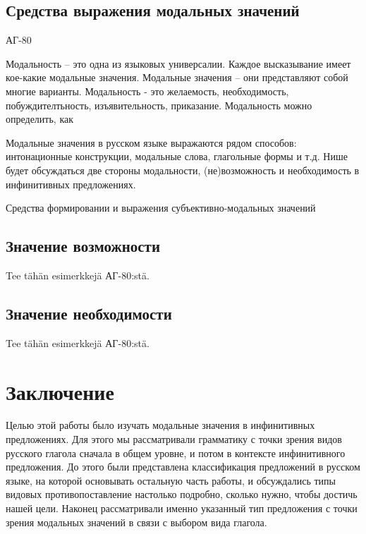 \documentclass{article}
\begin{document}
\subsection{Средства выражения модальных значений}

АГ-80 

Модальность -- это одна из языковых универсалии. Каждое высказывание имеет кое-какие модальные значения. Модальные значения -- они представляют собой многие варианты. Модальность - это желаемость, необходимость, побуждителтьность, изъявительность, приказание. Модальность можно определить, как 

Модальные значения в русском языке выражаются рядом способов: интонационные конструкции, модальные слова, глагольные формы и т.д. Нише будет обсуждаться две стороны модальности, (не)возможность и необходимость в инфинитивных предложениях.

Средства формировании и выражения субъективно-модальных значений


\subsection{Значение возможности}

Tee tähän esimerkkejä АГ-80:stä.

\subsection{Значение необходимости}

Tee tähän esimerkkejä АГ-80:stä.

\section{Заключение}

Целью этой работы было изучать модальные значения в инфинитивных предложениях. Для этого мы рассматривали грамматику с точки зрения видов русского глагола сначала в общем уровне, и потом в контексте инфинитивного предложения. До этого были представлена классификация предложений в русском языке, на которой основывать остальную часть работы, и обсуждались типы видовых противопоставление настолько подробно, сколько нужно, чтобы достичь нашей цели. Наконец рассматривали именно указанный тип предложения с точки зрения модальных значений в связи с выбором вида глагола.
\end{document}
